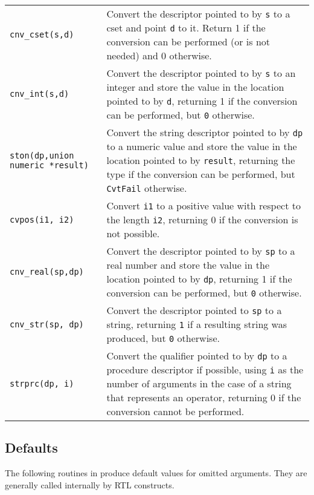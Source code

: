 \begin{xtabular}{l@{\hspace{1cm}}p{11cm}}

\texttt{cnv\_cset(s,d)} &
Convert the descriptor pointed to by \texttt{s} to a cset and point
\texttt{d} to it. Return 1 if the conversion can be performed (or is
not needed) and 0 otherwise.\\

\texttt{cnv\_int(s,d)} &
Convert the descriptor pointed to by \texttt{s} to an integer and store the
value in the location pointed to by \texttt{d}, returning 1 if the
conversion can be performed, but \texttt{0} otherwise.\\

\texttt{ston(dp,union numeric *result)} &
Convert the string descriptor pointed to by \texttt{dp} to a numeric
value and store the value in the location pointed to by
\texttt{result}, returning the type if the
conversion can be performed, but \texttt{CvtFail} otherwise.\\

\texttt{cvpos(i1, i2)} &
Convert \texttt{i1} to a positive value with respect to the length \texttt{i2},
returning 0 if the conversion is not possible.\\

\texttt{cnv\_real(sp,dp)} &
Convert the descriptor pointed to by \texttt{sp} to a real number and store
the value in the location pointed to by \texttt{dp}, returning 1 if the
conversion can be performed, but \texttt{0} otherwise.\\

\texttt{cnv\_str(sp, dp)} &
Convert the descriptor pointed to \texttt{sp} to a string,
returning \texttt{1} if a resulting string was produced,
but \texttt{0} otherwise.\\

\texttt{strprc(dp, i)} &
Convert the qualifier pointed to by \texttt{dp} to a procedure descriptor if
possible, using \texttt{i} as the number of arguments in the case of a string
that represents an operator, returning 0 if the conversion cannot be performed.\\

\end{xtabular}

\subsection{Defaults}

The following routines in  produce default values for
omitted arguments. They are generally called internally by RTL constructs.

